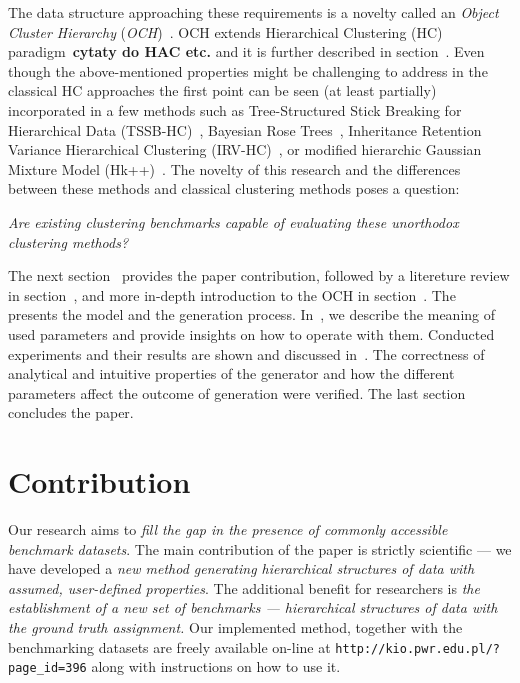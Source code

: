 \documentclass{article}
\begin{document}
The data structure approaching these requirements is a novelty called an \textit{Object Cluster Hierarchy} (\textit{OCH})~\cite{Spytkowski2012,Olech2016}. OCH extends Hierarchical Clustering (HC) paradigm~\textbf{cytaty do HAC etc.} and it is further described in section~. Even though the above-mentioned properties might be challenging to address in the classical HC approaches the first point can be seen (at least partially) incorporated in a few methods such as Tree-Structured Stick Breaking for Hierarchical Data (TSSB-HC)~\cite{ghahramani2010tree}, Bayesian Rose Trees~\cite{2010_bayesian_rose_trees}, Inheritance Retention Variance Hierarchical Clustering (IRV-HC)~\cite{Spytkowski2012}, or modified hierarchic Gaussian Mixture Model (Hk++)~\cite{Olech2016}. The novelty of this research and the differences between these methods and classical clustering methods poses a question:

\textit{Are existing clustering benchmarks capable of evaluating these unorthodox clustering methods?}

The next section~ provides the paper contribution, followed by a litereture review in section~, and more in-depth introduction to the OCH in section~. The~  presents the model and the generation process. In~, we describe the meaning of used parameters and provide insights on how to operate with them. Conducted experiments and their results are shown and discussed in~. The correctness of analytical and intuitive properties of the generator and how the different parameters affect the outcome of generation were verified. The last section concludes the paper.

\section{Contribution}
\label{sec:contrib}
Our research aims to \textit{fill the gap in the presence of commonly accessible benchmark datasets}.
    The main contribution of the paper is strictly scientific --- we have developed a \textit{new method generating hierarchical structures of data with assumed, user-defined properties}. The additional benefit for researchers is \textit{the establishment of a new set of benchmarks --- hierarchical structures of data with the ground truth assignment.} Our implemented method, together with the benchmarking datasets are freely available on-line at \texttt{http://kio.pwr.edu.pl/?page\_id=396} along with instructions on how to use it.
\end{document}
